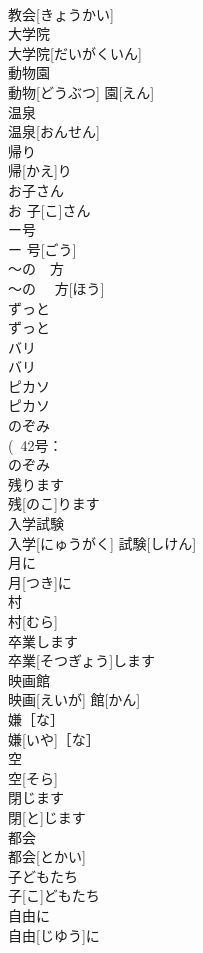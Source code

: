 \documentclass[8pt]{extreport}
\begin{document}
\begin{CJK}{UTF8}{min}
\\	教会[きょうかい]	
\\	大学院	
\\	大学院[だいがくいん]	
\\	動物園	
\\	動物[どうぶつ] 園[えん]	
\\	温泉	
\\	温泉[おんせん]	
\\	帰り	
\\	帰[かえ]り	
\\	お子さん	
\\	お 子[こ]さん	
\\	ー号	
\\	ー 号[ごう]	
\\	〜の　方	
\\	〜の　 方[ほう]	
\\	ずっと	
\\	ずっと	
\\	バリ	
\\	バリ	
\\	ピカソ	
\\	ピカソ	
\\	のぞみ	
\\	(~42号：
\\	のぞみ	
\\	残ります	
\\	残[のこ]ります	
\\	入学試験	
\\	入学[にゅうがく] 試験[しけん]	
\\	月に	
\\	月[つき]に	
\\	村	
\\	村[むら]	
\\	卒業します	
\\	卒業[そつぎょう]します	
\\	映画館	
\\	映画[えいが] 館[かん]	
\\	嫌［な］	
\\	嫌[いや]［な］	
\\	空	
\\	空[そら]	
\\	閉じます	
\\	閉[と]じます	
\\	都会	
\\	都会[とかい]	
\\	子どもたち	
\\	子[こ]どもたち	
\\	自由に	
\\	自由[じゆう]に	

\end{CJK}
\end{document}
